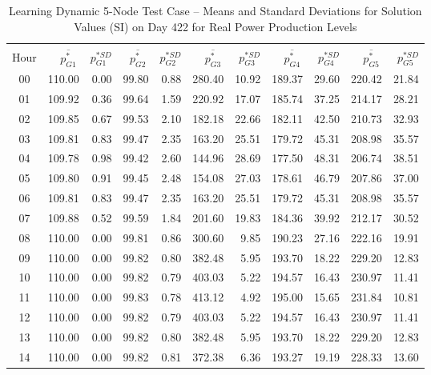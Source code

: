 \documentclass[12pt]{article}
\begin{document}
\begin{table}[h]
	\caption{Learning Dynamic 5-Node Test Case -- Means and Standard Deviations for Solution Values (SI) on Day 422 for Real Power Production Levels} 
	\label{tab: 5Node.Learning.Prods}
\begin{minipage}{\textwidth}
	\centering
\begin{tabular}{crrrrrrrrrr} 
\hline\hline \\[0.1ex]
Hour & $\overline{p_{G1}^\ast}~$ & $p_{G1}^{\ast SD}$ & $\overline{p_{G2}^\ast}~$ & $p_{G2}^{\ast SD}$ & $\overline{p_{G3}^\ast}~$ & $p_{G3}^{\ast SD}$ & $\overline{p_{G4}^\ast}~$ & $p_{G4}^{\ast SD}$ & $\overline{p_{G5}^\ast}~$ & $p_{G5}^{\ast SD}$\\
\hline
00	&	110.00	&	0.00	&	99.80	&	0.88	&	280.40	&	10.92	&	189.37	&	29.60	&	220.42	&	21.84	\\
01	&	109.92	&	0.36	&	99.64	&	1.59	&	220.92	&	17.07	&	185.74	&	37.25	&	214.17	&	28.21	\\
02	&	109.85	&	0.67	&	99.53	&	2.10	&	182.18	&	22.66	&	182.11	&	42.50	&	210.73	&	32.93	\\
03	&	109.81	&	0.83	&	99.47	&	2.35	&	163.20	&	25.51	&	179.72	&	45.31	&	208.98	&	35.57	\\
04	&	109.78	&	0.98	&	99.42	&	2.60	&	144.96	&	28.69	&	177.50	&	48.31	&	206.74	&	38.51	\\
05	&	109.80	&	0.91	&	99.45	&	2.48	&	154.08	&	27.03	&	178.61	&	46.79	&	207.86	&	37.00	\\
06	&	109.81	&	0.83	&	99.47	&	2.35	&	163.20	&	25.51	&	179.72	&	45.31	&	208.98	&	35.57	\\
07	&	109.88	&	0.52	&	99.59	&	1.84	&	201.60	&	19.83	&	184.36	&	39.92	&	212.17	&	30.52	\\
08	&	110.00	&	0.00	&	99.81	&	0.86	&	300.60	&	9.85	&	190.23	&	27.16	&	222.16	&	19.91	\\
09	&	110.00	&	0.00	&	99.82	&	0.80	&	382.48	&	5.95	&	193.70	&	18.22	&	229.20	&	12.83	\\
10	&	110.00	&	0.00	&	99.82	&	0.79	&	403.03	&	5.22	&	194.57	&	16.43	&	230.97	&	11.41	\\
11	&	110.00	&	0.00	&	99.83	&	0.78	&	413.12	&	4.92	&	195.00	&	15.65	&	231.84	&	10.81	\\
12	&	110.00	&	0.00	&	99.82	&	0.79	&	403.03	&	5.22	&	194.57	&	16.43	&	230.97	&	11.41	\\
13	&	110.00	&	0.00	&	99.82	&	0.80	&	382.48	&	5.95	&	193.70	&	18.22	&	229.20	&	12.83	\\
14	&	110.00	&	0.00	&	99.82	&	0.81	&	372.38	&	6.36	&	193.27	&	19.19	&	228.33	&	13.60	\\

\end{tabular}
\end{minipage}
\end{table}
\end{document}
